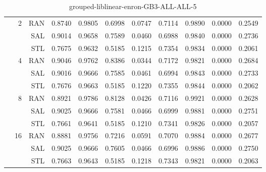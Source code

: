 \begin{center}
\begin{table}[htbp]
\begin{tabular}{ | r | r | r | r | r | r | r | r | r | r | r |}
 & \multirow{3}{*}{2} & RAN & 0.8740 & 0.9805 & 0.6998 & 0.0747 & 0.7114 & 0.9890 & 0.0000 & 0.2549\\ \cline{3-11}
 &   & SAL & 0.9014 & 0.9658 & 0.7589 & 0.0460 & 0.6988 & 0.9840 & 0.0000 & 0.2736\\ \cline{3-11}
 &   & STL & 0.7675 & 0.9632 & 0.5185 & 0.1215 & 0.7354 & 0.9834 & 0.0000 & 0.2061\\ \cline{2-11}
 & \multirow{3}{*}{4} & RAN & 0.9046 & 0.9762 & 0.8386 & 0.0344 & 0.7172 & 0.9821 & 0.0000 & 0.2684\\ \cline{3-11}
 &   & SAL & 0.9016 & 0.9666 & 0.7585 & 0.0461 & 0.6994 & 0.9843 & 0.0000 & 0.2733\\ \cline{3-11}
 &   & STL & 0.7676 & 0.9663 & 0.5185 & 0.1220 & 0.7355 & 0.9844 & 0.0000 & 0.2062\\ \cline{2-11}
 & \multirow{3}{*}{8} & RAN & 0.8921 & 0.9786 & 0.8128 & 0.0426 & 0.7116 & 0.9921 & 0.0000 & 0.2628\\ \cline{3-11}
 &   & SAL & 0.9025 & 0.9666 & 0.7581 & 0.0466 & 0.6999 & 0.9881 & 0.0000 & 0.2751\\ \cline{3-11}
 &   & STL & 0.7661 & 0.9641 & 0.5185 & 0.1210 & 0.7341 & 0.9826 & 0.0000 & 0.2057\\ \cline{2-11}
 & \multirow{3}{*}{16} & RAN & 0.8881 & 0.9756 & 0.7216 & 0.0591 & 0.7070 & 0.9884 & 0.0000 & 0.2677\\ \cline{3-11}
 &   & SAL & 0.9025 & 0.9666 & 0.7605 & 0.0466 & 0.6996 & 0.9886 & 0.0000 & 0.2750\\ \cline{3-11}
 &   & STL & 0.7663 & 0.9643 & 0.5185 & 0.1218 & 0.7343 & 0.9821 & 0.0000 & 0.2063\\ \cline{2-11}
\hline
\end{tabular}
\caption{grouped-liblinear-enron-GB3-ALL-ALL-5}
\end{table}
\end{center}

